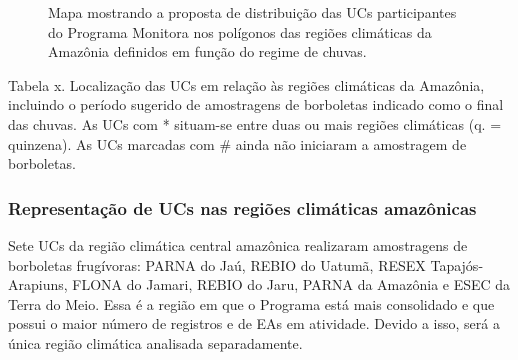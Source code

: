 \documentclass[
  letterpaper,
]{scrbook}
\begin{document}
\begin{figure}[H]


\caption{\label{fig-regioes-climaticas}Mapa mostrando a proposta de
distribuição das UCs participantes do Programa Monitora nos polígonos
das regiões climáticas da Amazônia definidos em função do regime de
chuvas.}

\end{figure}%

Tabela x. Localização das UCs em relação às regiões climáticas da
Amazônia, incluindo o período sugerido de amostragens de borboletas
indicado como o final das chuvas. As UCs com * situam-se entre duas ou
mais regiões climáticas (q. = quinzena). As UCs marcadas com \# ainda
não iniciaram a amostragem de borboletas.

\subsubsection{Representação de UCs nas regiões climáticas
amazônicas}\label{representauxe7uxe3o-de-ucs-nas-regiuxf5es-climuxe1ticas-amazuxf4nicas}

Sete UCs da região climática central amazônica realizaram amostragens de
borboletas frugívoras: PARNA do Jaú, REBIO do Uatumã, RESEX
Tapajós-Arapiuns, FLONA do Jamari, REBIO do Jaru, PARNA da Amazônia e
ESEC da Terra do Meio. Essa é a região em que o Programa está mais
consolidado e que possui o maior número de registros e de EAs em
atividade. Devido a isso, será a única região climática analisada
separadamente.
\end{document}
